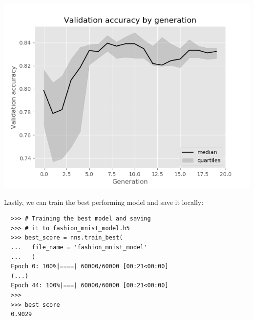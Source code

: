 \documentclass[sigconf]{acmart}
\begin{document}
\begin{center}
  \includegraphics[scale=0.42]{gfx/fashion_mnist_example.png}
\end{center}

Lastly, we can train the best performing model and save it locally:

\lstset{caption = Saving the optimised model}
\begin{lstlisting}
  >>> # Training the best model and saving 
  >>> # it to fashion_mnist_model.h5
  >>> best_score = nns.train_best(
  ...   file_name = 'fashion_mnist_model'
  ...   )
  Epoch 0: 100%|====| 60000/60000 [00:21<00:00]
  (...)
  Epoch 44: 100%|===| 60000/60000 [00:21<00:00]
  >>>
  >>> best_score
  0.9029
\end{lstlisting}
\end{document}
